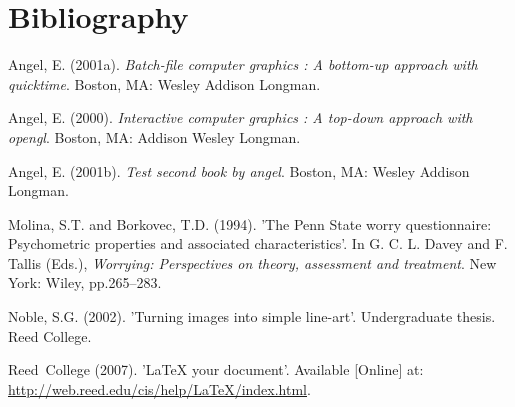 \documentclass[12pt,msc,a4paper,twoside]{ucl_thesis}
\begin{document}
  \backmatter
  
  \hypertarget{bibliography}{%
  \chapter*{Bibliography}\label{bibliography}}
  
  \noindent
  
  \setlength{\parindent}{-0.20in}
  \setlength{\leftskip}{0.20in}
  \setlength{\parskip}{8pt}
  
  \hypertarget{refs}{}
  \leavevmode\hypertarget{ref-angel2001}{}%
  Angel, E. (2001a). \emph{Batch-file computer graphics : A bottom-up approach with quicktime}. Boston, MA: Wesley Addison Longman.
  
  \leavevmode\hypertarget{ref-angel2000}{}%
  Angel, E. (2000). \emph{Interactive computer graphics : A top-down approach with opengl}. Boston, MA: Addison Wesley Longman.
  
  \leavevmode\hypertarget{ref-angel2002a}{}%
  Angel, E. (2001b). \emph{Test second book by angel}. Boston, MA: Wesley Addison Longman.
  
  \leavevmode\hypertarget{ref-Molina1994}{}%
  Molina, S.T. and Borkovec, T.D. (1994). 'The Penn State worry questionnaire: Psychometric properties and associated characteristics'. In G. C. L. Davey and F. Tallis (Eds.), \emph{Worrying: Perspectives on theory, assessment and treatment}. New York: Wiley, pp.265--283.
  
  \leavevmode\hypertarget{ref-noble2002}{}%
  Noble, S.G. (2002). 'Turning images into simple line-art'. Undergraduate thesis. Reed College.
  
  \leavevmode\hypertarget{ref-reedweb2007}{}%
  Reed~College (2007). 'LaTeX your document'. Available {[}Online{]} at: \url{http://web.reed.edu/cis/help/LaTeX/index.html}.


\end{document}
